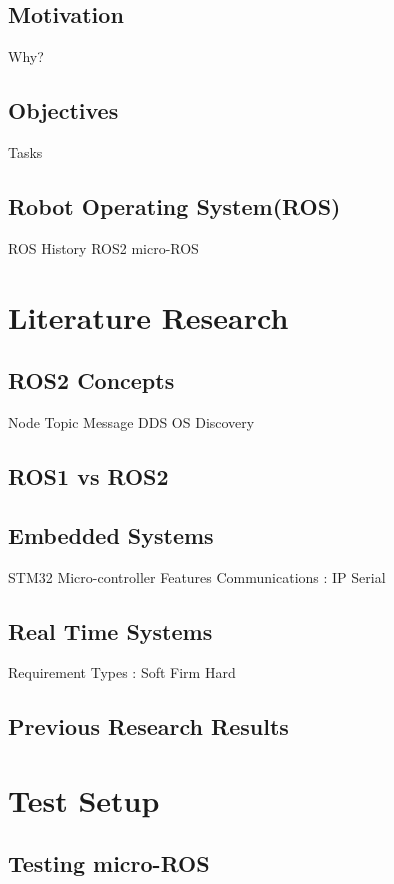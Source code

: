 \documentclass[%
xelatex,
	oneside,		%
	12pt,			%
	parskip=half,	%
	headsepline,	%
	footsepline,	%
	abstracton,
	chapterprefix=true%
    appendixprefix=true]
{scrreprt}
\begin{document}
     \section{Motivation}	
			Why?
	 \section{Objectives}
	 Tasks
	 \section{Robot Operating System(ROS)}
	 ROS
	 History
	 ROS2
	 micro-ROS
	 
	 
	\chapter{Literature Research}	
	
	\section{ROS2 Concepts}
	Node
	Topic
	Message
	DDS
	OS
	Discovery

	\section{ROS1 vs ROS2}	
	
	\section{Embedded Systems}
	STM32 Micro-controller
	Features
	Communications : 
	IP
	Serial
	
	\section{Real Time Systems}
		Requirement
		Types : Soft
		Firm
		Hard
		
	\section{Previous Research Results}
	
		
	
	
	
	\chapter{Test Setup}
	
	\section{Testing micro-ROS}
\end{document}
